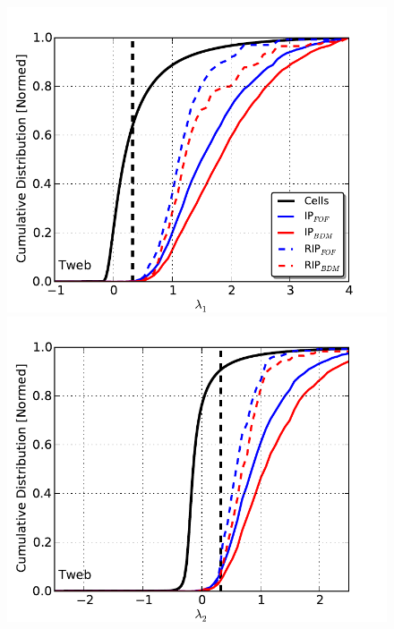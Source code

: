 \documentclass[a4,useAMS,usenatbib,usegraphicx]{latex/mn2e}
\begin{document}
\begin{flushleft}
\begin{figure}
\begin{center}

  \includegraphics[trim = 3mm 0mm 10mm 8mm, clip, keepaspectratio=true,
  width=0.24\textheight]{./figures/eigen1_dist_Tweb}
  \includegraphics[trim = 3mm 0mm 10mm 8mm, clip, keepaspectratio=true,
  width=0.24\textheight]{./figures/eigen2_dist_Tweb}

\end{center}
\end{figure}
\end{flushleft}
\end{document}
